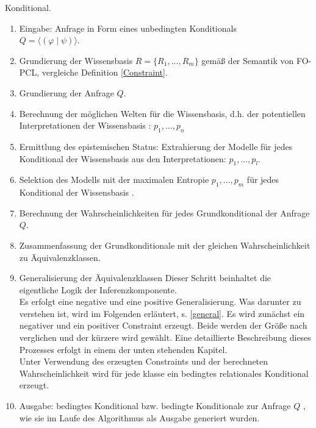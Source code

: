 \documentclass[a4paper, 11pt]{book}
\begin{document}
Konditional.
\begin{enumerate}
	\item Eingabe: Anfrage in Form eines unbedingten Konditionals\\
	$ Q = \langle (\varphi \mid \psi) \rangle $.
	\item Grundierung der Wissensbasis $ R = \{R_1, ..., R_m\} $ gemäß der Semantik von FO-PCL, vergleiche Definition \ref{Constraint}.
	\item Grundierung der Anfrage $ Q $.
	\item Berechnung der möglichen Welten für die Wissensbasis, d.h. der potentiellen Interpretationen der Wissensbasis : $ p_1, ..., p_n $
	\item Ermittlung des epistemischen Status: Extrahierung der Modelle für jedes Konditional der Wissensbasis aus den Interpretationen: $ p_1, ..., p_l $.
	\item Selektion des Modells mit der maximalen Entropie $p_1, ..., p_m$ für jedes Konditional der Wissensbasis .
	\item Berechnung der Wahrscheinlichkeiten für jedes Grundkonditional der Anfrage $ Q $.
	\item Zusammenfassung der Grundkonditionale mit der gleichen Wahrscheinlichkeit zu Äquivalenzklassen. 

	\item Generalisierung der Äquivalenzklassen 
	Dieser Schritt beinhaltet die eigentliche Logik der Inferenzkomponente.\\
	Es erfolgt eine negative und eine positive Generalisierung. Was darunter zu verstehen ist, wird im Folgenden erläutert, s. \ref{general}. 
	Es wird zunächst ein negativer und ein positiver Constraint erzeugt. Beide werden der Größe nach verglichen und der kürzere wird gewählt. Eine detaillierte Beschreibung dieses Prozesses erfolgt in einem der unten stehenden Kapitel.\\
	Unter Verwendung des erzeugten Constraints und der berechneten Wahrscheinlichkeit wird für jede klasse ein bedingtes relationales Konditional erzeugt.
	
	\item Ausgabe: bedingtes Konditional bzw. bedingte Konditionale zur Anfrage $ Q $ , wie sie im Laufe des Algorithmus als Ausgabe generiert wurden.
	
	
	
\end{enumerate}
\end{document}

